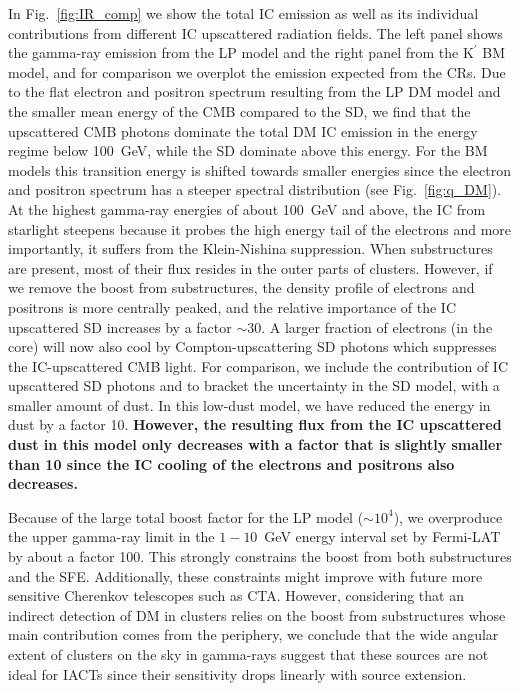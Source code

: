 \documentclass[10pt,aps,pra,reprint,amsmath,amsfonts,amssymb,showpacs,nofootinbib,floatfix]{revtex4-1}
\def\del#1{{}}
\def\C#1{{\bf #1}}
\newcommand{\rmn}{\mathrm}
\newcommand{\Kp}{\rmn{K}^\prime}
\begin{document}
In Fig.~\ref{fig:IR_comp} we show the total IC emission as well as its
individual contributions from different IC upscattered radiation
fields. The left panel shows the gamma-ray emission from the LP model
and the right panel from the $\Kp$ BM model, and for comparison we
overplot the emission expected from the CRs. Due to the flat electron
and positron spectrum resulting from the LP DM model and the smaller
mean energy of the CMB compared to the SD, we find that the
upscattered CMB photons dominate the total DM IC emission in the
energy regime below 100~GeV, while the SD dominate above this
energy. For the BM models this transition energy is shifted towards
smaller energies since the electron and positron spectrum has a
steeper spectral distribution (see Fig.~\ref{fig:q_DM}). At the
highest gamma-ray energies of about 100~GeV and above, the IC from
starlight steepens because it probes the high energy tail of the
electrons and more importantly, it suffers from the Klein-Nishina
suppression. When substructures are present, most of their flux
resides in the outer parts of clusters. However, if we remove the
boost from substructures, the density profile of electrons and
positrons is more centrally peaked, and the relative importance of the
IC upscattered SD increases by a factor $\sim 30$.  A larger fraction
of electrons (in the core) will now also cool by Compton-upscattering
SD photons which suppresses the IC-upscattered CMB light.  For
comparison, we include the contribution of IC upscattered SD photons
and to bracket the uncertainty in the SD model, with a smaller amount
of dust. In this low-dust model, we have reduced the energy in dust by
a factor 10. \C{However, the resulting flux from the IC upscattered
  dust in this model only decreases with a factor that is slightly
  smaller than 10 since the IC cooling of the electrons and positrons
  also decreases.}\del{However, we find that the IC
  SD flux only decreases by a factor 3 since the IC cooling of the
  electrons and positrons also decreases. Note that for a smaller
  boost from substructures, the effect from cooling is smaller.}

Because of the large total boost factor for the LP model ($\sim
10^4$), we overproduce the upper gamma-ray limit in the $1-10$~GeV
energy interval set by Fermi-LAT by about a factor 100. This strongly
constrains the boost from both substructures and the
SFE. Additionally, these constraints might improve with future more
sensitive Cherenkov telescopes such as CTA. However, considering that
an indirect detection of DM in clusters relies on the boost from
substructures whose main contribution comes from the periphery, we
conclude that the wide angular extent of clusters on the sky in
gamma-rays suggest that these sources are not ideal for IACTs since
their sensitivity drops linearly with source extension.
\end{document}
